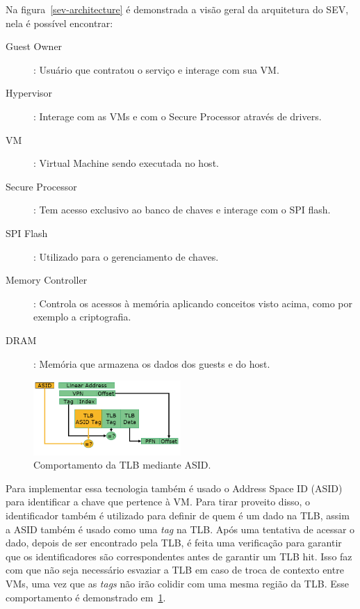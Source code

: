 \documentclass{report}
\begin{document}
Na figura~\ref{sev-architecture} é demonstrada a visão geral da arquitetura do
SEV, nela é possível encontrar:

\begin{description}
    \item[Guest Owner]: Usuário que contratou o serviço e interage com sua VM\@.
    \item[Hypervisor]: Interage com as VMs e com o Secure Processor através de
    drivers.
    \item[VM]: Virtual Machine sendo executada no host.
    \item[Secure Processor]: Tem acesso exclusivo ao banco de chaves e interage
    com o SPI flash.
    \item[SPI Flash]: Utilizado para o gerenciamento de chaves.
    \item[Memory Controller]: Controla os acessos à memória aplicando
    conceitos visto acima, como por exemplo a criptografia.
    \item[DRAM]: Memória que armazena os dados dos guests e do host.
\end{description}

\begin{figure}[h]
    \centering
    \includegraphics[width=0.5\textwidth]{img/asid}
    \caption{Comportamento da TLB mediante ASID\@.}\label{asid}
\end{figure}

Para implementar essa tecnologia também é usado o Address Space ID (ASID) para
identificar a chave que pertence à VM\@. Para tirar proveito disso, o
identificador também é utilizado para definir de quem é um dado na TLB, assim a
ASID também é usado como uma \textit{tag} na TLB\@. Após uma tentativa de
acessar o dado, depois de ser encontrado pela TLB, é feita uma verificação para
garantir que os identificadores são correspondentes antes de garantir um TLB
hit. Isso faz com que não seja necessário esvaziar a TLB em caso de troca de
contexto entre VMs, uma vez que as \textit{tags} não irão colidir com uma mesma
região da TLB\@. Esse comportamento é demonstrado em~\ref{asid}.
\end{document}
